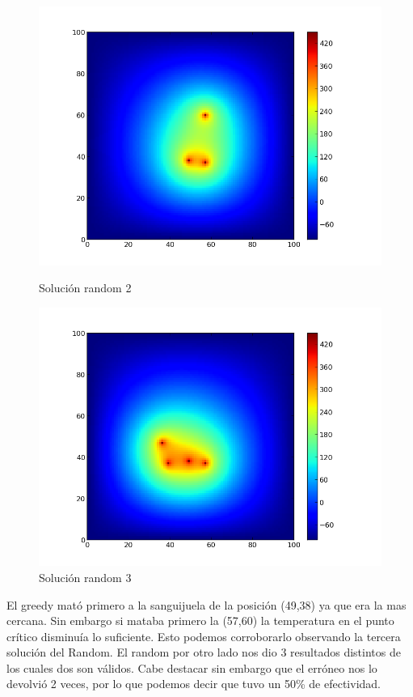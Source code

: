 \begin{figure}[htb]
\begin{center}
\includegraphics[scale=0.40]{imagenes/test6_random_2.png} 
\caption{Solución random 2} 
        \end{center}
\endminipage\hfill 
{}
\begin{center}
\includegraphics[scale=0.40]{imagenes/test6_random_3.png} 
\caption{Solución random 3} 
        \end{center}
\endminipage\hfill 
\end{figure}


El greedy mató primero a la sanguijuela de la posición (49,38) ya que era la mas cercana. Sin embargo si mataba primero la (57,60) la temperatura en el punto crítico disminuía lo suficiente. Esto podemos corroborarlo observando la tercera solución del Random.
El random por otro lado nos dio 3 resultados distintos de los cuales dos son válidos. Cabe destacar sin embargo que el erróneo nos lo devolvió 2 veces, por lo que podemos decir que tuvo un 50\% de efectividad. 


